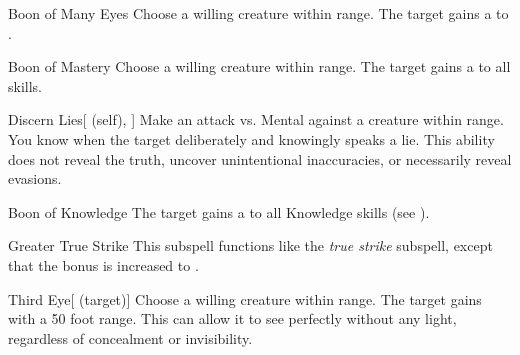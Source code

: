 \begin{ability}[\nth{2}]{Boon of Many Eyes}
Choose a willing creature within \rngclose range.
The target gains a   to .
\end{ability}
\vspace{0.25em}



\begin{ability}[\nth{2}]{Boon of Mastery}
Choose a willing creature within \rngclose range.
The target gains a   to all skills.
\end{ability}
\vspace{0.25em}



\begin{ability}[\nth{2}]{Discern Lies}[ (self), ]
Make an attack vs. Mental against a creature within \rngmed range.
\hit You know when the target deliberately and knowingly speaks a lie.
This ability does not reveal the truth, uncover unintentional inaccuracies, or necessarily reveal evasions.
\end{ability}
\vspace{0.25em}



\begin{ability}[\nth{3}]{Boon of Knowledge}
The target gains a   to all Knowledge skills (see ).
\end{ability}
\vspace{0.25em}



\begin{ability}[\nth{3}]{Greater True Strike}
This subspell functions like the \textit{true strike} subspell, except that the bonus is increased to .
\end{ability}
\vspace{0.25em}



\begin{ability}[\nth{3}]{Third Eye}[ (target)]
Choose a willing creature within \rngclose range.
The target gains  with a 50 foot range.
This can allow it to see perfectly without any light, regardless of concealment or invisibility.
\end{ability}
\vspace{0.25em}



